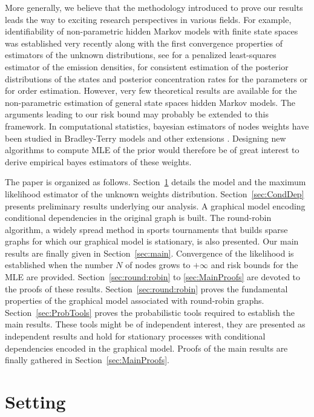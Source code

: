 More generally, we believe that the methodology introduced to prove our results leads the way to exciting research perspectives in various fields. 
For example, identifiability of non-parametric hidden Markov models with finite state spaces was established very recently along with the first convergence properties of estimators of the unknown distributions, see  \cite{decastro:gassiat:lacour:2016} for a penalized least-squares estimator of the emission densities,  \cite{decastro:gassiat:lecorff:2017,vernet:2015,vernet:2017} for consistent estimation of the posterior distributions of the states and posterior concentration rates for the parameters  or \cite{lehericy:2017} for order estimation.
However, very few theoretical results are available for the non-parametric estimation of general state spaces hidden Markov models. 
The arguments leading to our risk bound may probably be extended to this framework. 
In computational statistics, bayesian estimators of nodes weights have been studied in Bradley-Terry models and other extensions \cite{caron:doucet:2012}. 
Designing new algorithms to compute MLE of the prior would therefore be of great interest to derive empirical bayes estimators of these weights. 

The paper is organized as follows. 
Section~\ref{sec:setting} details the model and the maximum likelihood estimator of  the unknown weights distribution.
Section~\ref{sec:CondDep} presents preliminary results underlying our analysis. A graphical model encoding conditional dependencies in the original graph is built. The round-robin algorithm, a widely spread method in sports tournaments that  builds sparse graphs for which our graphical model is stationary, is also presented. Our main results are finally given in Section~\ref{sec:main}. Convergence of the likelihood is established when the number $N$ of nodes grows to $+\infty$ and risk bounds for the MLE are provided. 
Section~\ref{sec:round:robin} to \ref{sec:MainProofs} are devoted to the proofs of these results. Section~\ref{sec:round:robin} proves the fundamental properties of the graphical model associated with round-robin graphs.
Section~\ref{sec:ProbTools} proves the probabilistic tools required to establish the main results. These tools might be of independent interest, they are presented as independent results and hold for stationary processes with conditional dependencies encoded in the graphical model. 
Proofs of the main results are finally gathered in Section~\ref{sec:MainProofs}.


\section{Setting}
\label{sec:setting}
